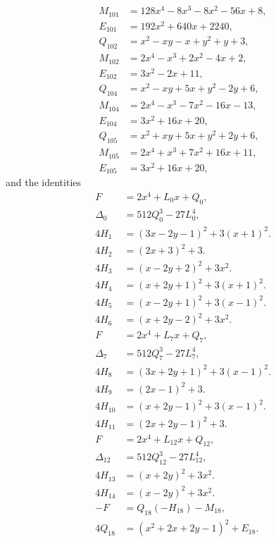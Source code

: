 \documentclass[11pt]{article}
\begin{document}
\begin{align*}
M_{101}&=128x^{4}-8x^{3}-8x^{2}-56x+8,\\
E_{101}&=192x^{2}+640x+2240,\\
Q_{102}&=x^{2}-xy-x+y^{2}+y+3,\\
M_{102}&=2x^{4}-x^{3}+2x^{2}-4x+2,\\
E_{102}&=3x^{2}-2x+11,\\
Q_{104}&=x^{2}-xy+5x+y^{2}-2y+6,\\
M_{104}&=2x^{4}-x^{3}-7x^{2}-16x-13,\\
E_{104}&=3x^{2}+16x+20,\\
Q_{105}&=x^{2}+xy+5x+y^{2}+2y+6,\\
M_{105}&=2x^{4}+x^{3}+7x^{2}+16x+11,\\
E_{105}&=3x^{2}+16x+20,
\end{align*}
and the identities
\begin{align}
F&=2x^4+L_{0}x+Q_{0},\label{eq:sign0}\\
\Delta_{0}&=512Q_{0}^3-27L_{0}^4,\label{eq:sign0b}\\
4H_{1}&=(3x-2y-1)^2+3(x+1)^2.\label{eq:sign1}\\
4H_{2}&=(2x+3)^2+3.\label{eq:sign2}\\
4H_{3}&=(x-2y+2)^2+3x^2.\label{eq:sign3}\\
4H_{4}&=(x+2y+1)^2+3(x+1)^2.\label{eq:sign4}\\
4H_{5}&=(x-2y+1)^2+3(x-1)^2.\label{eq:sign5}\\
4H_{6}&=(x+2y-2)^2+3x^2.\label{eq:sign6}\\
F&=2x^4+L_{7}x+Q_{7},\label{eq:sign7}\\
\Delta_{7}&=512Q_{7}^3-27L_{7}^4,\label{eq:sign7b}\\
4H_{8}&=(3x+2y+1)^2+3(x-1)^2.\label{eq:sign8}\\
4H_{9}&=(2x-1)^2+3.\label{eq:sign9}\\
4H_{10}&=(x+2y-1)^2+3(x-1)^2.\label{eq:sign10}\\
4H_{11}&=(2x+2y-1)^2+3.\label{eq:sign11}\\
F&=2x^4+L_{12}x+Q_{12},\label{eq:sign12}\\
\Delta_{12}&=512Q_{12}^3-27L_{12}^4,\label{eq:sign12b}\\
4H_{13}&=(x+2y)^2+3x^2.\label{eq:sign13}\\
4H_{14}&=(x-2y)^2+3x^2.\label{eq:sign14}\\
-F&=Q_{18}(-H_{18})-M_{18},\label{eq:sign18}\\
4Q_{18}&=(x^{2}+2x+2y-1)^2+E_{18}.\label{eq:sign18b}\\

\end{align}
\end{document}

